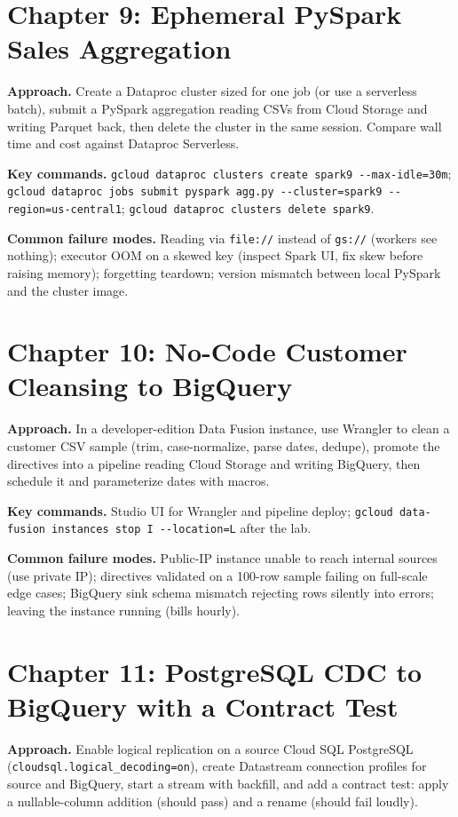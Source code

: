 \section{Chapter 9: Ephemeral PySpark Sales Aggregation}
\textbf{Approach.} Create a Dataproc cluster sized for one job (or use a serverless batch), submit
a PySpark aggregation reading CSVs from Cloud Storage and writing Parquet back, then delete the
cluster in the same session. Compare wall time and cost against Dataproc Serverless.

\textbf{Key commands.} \texttt{gcloud dataproc clusters create spark9 -{}-max-idle=30m};
\texttt{gcloud dataproc jobs submit pyspark agg.py -{}-cluster=spark9 -{}-region=us-central1};
\texttt{gcloud dataproc clusters delete spark9}.

\textbf{Common failure modes.} Reading via \texttt{file://} instead of \texttt{gs://} (workers see
nothing); executor OOM on a skewed key (inspect Spark UI, fix skew before raising memory);
forgetting teardown; version mismatch between local PySpark and the cluster image.

\section{Chapter 10: No-Code Customer Cleansing to BigQuery}
\textbf{Approach.} In a developer-edition Data Fusion instance, use Wrangler to clean a customer
CSV sample (trim, case-normalize, parse dates, dedupe), promote the directives into a pipeline
reading Cloud Storage and writing BigQuery, then schedule it and parameterize dates with macros.

\textbf{Key commands.} Studio UI for Wrangler and pipeline deploy;
\texttt{gcloud data-fusion instances stop I -{}-location=L} after the lab.

\textbf{Common failure modes.} Public-IP instance unable to reach internal sources (use private
IP); directives validated on a 100-row sample failing on full-scale edge cases; BigQuery sink
schema mismatch rejecting rows silently into errors; leaving the instance running (bills hourly).

\section{Chapter 11: PostgreSQL CDC to BigQuery with a Contract Test}
\textbf{Approach.} Enable logical replication on a source Cloud SQL PostgreSQL
(\texttt{cloudsql.logical\_decoding=on}), create Datastream connection profiles for source and
BigQuery, start a stream with backfill, and add a contract test: apply a nullable-column addition
(should pass) and a rename (should fail loudly).

